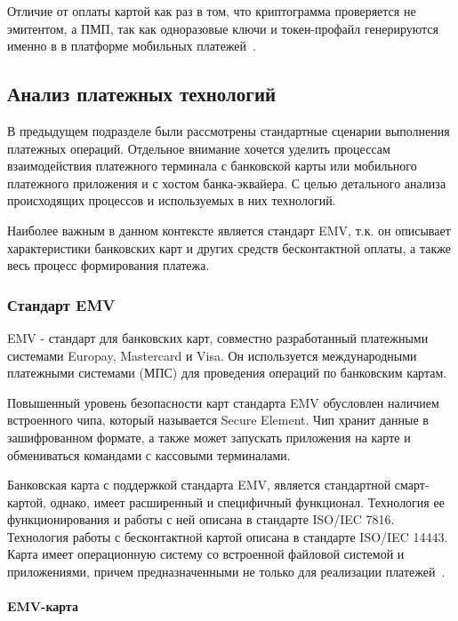 Отличие от оплаты картой как раз в том, что криптограмма проверяется не эмитентом, а ПМП, так как одноразовые ключи и токен-профайл генерируются именно в в платформе мобильных платежей~\cite{habr_nspk_mir_payment}.


\subsection{Анализ платежных технологий}

В предыдущем подразделе были рассмотрены стандартные сценарии выполнения платежных операций.
Отдельное внимание хочется уделить процессам взаимодействия платежного терминала с банковской карты или мобильного платежного приложения и с хостом банка-эквайера.
С целью детального анализа происходящих процессов и используемых в них технологий.

Наиболее важным в данном контексте является стандарт EMV, т.к. он описывает характеристики банковских карт и других средств бесконтактной оплаты, а также весь процесс формирования платежа.

\subsubsection{Стандарт EMV}

EMV - стандарт для банковских карт, совместно разработанный платежными системами Europay, Mastercard и Visa.
Он используется  международными платежными системами (МПС) для проведения операций по банковским картам.

Повышенный уровень безопасности карт стандарта EMV обусловлен наличием встроенного чипа, который называется Secure Element.
Чип хранит данные в зашифрованном формате, а также может запускать приложения на карте и обмениваться командами с кассовыми терминалами.

Банковская карта с поддержкой стандарта EMV, является стандартной смарт-картой, однако, имеет расширенный и специфичный функционал.
Технология ее функционирования и работы с ней описана в стандарте ISO/IEC 7816.
Технология работы с бесконтактной картой описана в стандарте ISO/IEC 14443.
Карта имеет операционную систему со встроенной файловой системой и приложениями, причем предназначенными не только для реализации платежей~\cite{emv_specifications_book}.


\paragraph{EMV-карта}

